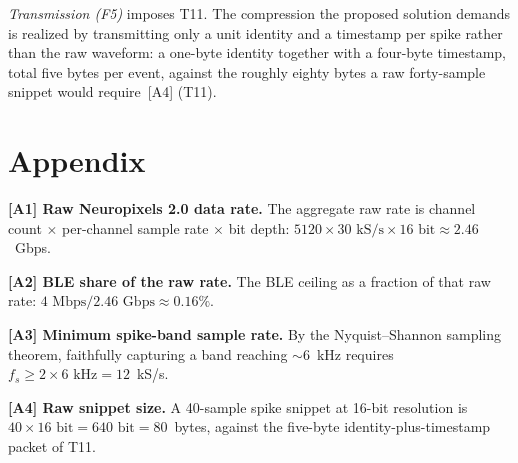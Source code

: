 \documentclass[11pt]{article}
\begin{document}
\emph{Transmission (F5)} imposes T11. The compression the proposed solution demands is realized by
transmitting only a unit identity and a timestamp per spike rather than the raw waveform:
a one-byte identity together with a four-byte timestamp, total five bytes per event, against the roughly eighty
bytes a raw forty-sample snippet would require~[A4] (T11).

\section*{Appendix}

\noindent\textbf{[A1] Raw Neuropixels 2.0 data rate.} The aggregate raw rate is channel
count $\times$ per-channel sample rate $\times$ bit depth:
$5120 \times 30\text{~kS/s} \times 16\text{~bit} \approx 2.46$~Gbps.

\smallskip
\noindent\textbf{[A2] BLE share of the raw rate.} The BLE ceiling as a fraction of that raw
rate: $4\text{~Mbps} / 2.46\text{~Gbps} \approx 0.16\%$.

\smallskip
\noindent\textbf{[A3] Minimum spike-band sample rate.} By the Nyquist--Shannon sampling
theorem, faithfully capturing a band reaching $\sim$6~kHz requires
$f_s \geq 2 \times 6\text{~kHz} = 12$~kS/s.

\smallskip
\noindent\textbf{[A4] Raw snippet size.} A 40-sample spike snippet at 16-bit resolution is
$40 \times 16\text{~bit} = 640\text{~bit} = 80$~bytes, against the five-byte
identity-plus-timestamp packet of T11.
\end{document}
